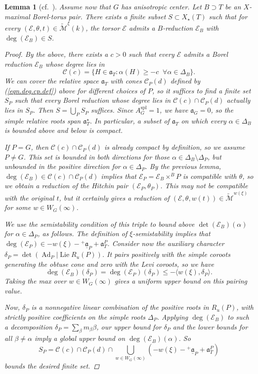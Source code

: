 \documentclass[openany]{amsbook}
\newtheorem{lemma}[theorem]{Lemma}
\theoremstyle{definition}
\theoremstyle{remark}
\numberwithin{equation}{section}
\newcommand{\cM}{\mathcal{M}}
\newcommand{\cE}{\mathcal{E}}
\newcommand{\ul}[1]{\underline{#1}}
\renewcommand{\-}{\operatorname{-}}
\renewcommand{\a}{\mathfrak{a}}
\newcommand{\on}[1]{\operatorname{#1}}
\newcommand{\ctM}{\widetilde{\cM}}
\newcommand{\Lie}{\on{Lie}}
\newcommand{\Ad}{\on{Ad}}
\newcommand{\spl}{\mathrm{spl}}
\newcommand{\gobtcone}{{}^+ \ul{\a}}
\begin{document}
\begin{lemma}[{{cf.\ \cite[{Lemme 6.1.6}]{CLI}}}]
Assume now that $G$ has anisotropic center. Let $B \supset T$ be an $X$-maximal Borel-torus pair. There exists a finite subset $S \subset X_\star(T)$ such that for every $(\cE, \theta, t) \in \ctM^\xi(k)$, the torsor $\cE$ admits a $B$-reduction $\cE_B$ with $\deg(\cE_B) \in S$.
\begin{proof}
By the above, there exists a $c > 0$ such that every $\cE$ admits a Borel reduction $\cE_B$ whose degree lies in
\[
    \mathcal{C}(c) = \{H \in \a_T : \alpha(H) \ge - c \;\;\forall \alpha \in \Delta_B\}.
\]
We can cover the relative space $\a_T$ with cones $\mathcal{C}_P(d)$ defined by (\ref{eqn.deg.cp.def}) above for different choices of $P$, so it suffices to find a finite set $S_P$ such that every Borel reduction whose degree lies in $\mathcal{C}(c) \cap \mathcal{C}_P(d)$ actually lies in $S_P$. Then $S = \bigcup_P S_P$ suffices. Since $A_G^\spl = 1$, we have $\a_G = 0$, so the simple relative roots span $\a_T^\star$. In particular, a subset of $\a_T$ on which every $\alpha \in \Delta_B$ is bounded above and below is compact. 

If $P = G$, then $\mathcal{C}(c) \cap \mathcal{C}_P(d)$ is already compact by definition, so we assume $P \neq G$. This set is bounded in both directions for those $\alpha \in \Delta_B \setminus \Delta_P$, but unbounded in the positive direction for $\alpha \in \Delta_P$. By the previous lemma, $\deg(\cE_B) \in \mathcal{C}(c) \cap \mathcal{C}_P(d)$ implies that $\cE_P = \cE_B \times^B P$ is compatible with $\theta$, so we obtain a reduction of the Hitchin pair $(\cE_P, \theta_P)$. This may not be compatible with the original $t$, but it certainly gives a reduction of $(\cE, \theta, w(t)) \in \ctM^{w(\xi)}$ for some $w \in W_G(\infty)$. 

We use the semistability condition of this triple to bound above $\det(\cE_B)(\alpha)$ for $\alpha \in \Delta_P$, as follows. The definition of $\xi$-semistability implies that $\deg(\cE_P) \in -w(\xi) - \gobtcone_P + \a_T^P$. Consider now the auxiliary character $\delta_P = \det(\Ad_P | \Lie R_u(P))$. It pairs positively with the simple coroots generating the obtuse cone and zero with the Levi coroots, so we have
$$
    \deg(\cE_B)(\delta_P) = \deg(\cE_P)(\delta_P) \le - \langle w(\xi), \delta_P \rangle.
$$
Taking the max over $w \in W_G(\infty)$ gives a uniform upper bound on this pairing value.

Now, $\delta_P$ is a nonnegative linear combination of the positive roots in $R_u(P)$, with strictly positive coefficients on the simple roots $\Delta_P$. Applying $\deg(\cE_B)$ to such a decomposition $\delta_P = \sum_\beta m_\beta \beta$, our upper bound for $\delta_P$ and the lower bounds for all $\beta \neq \alpha$ imply a global upper bound on $\deg(\cE_B)(\alpha)$. So
$$
    S_P = \mathcal{C}(c) \cap \mathcal{C}_P(d) \cap 
    \bigcup_{w \in W_G(\infty)} (-w(\xi) - \gobtcone_P + \a_T^P)
$$
bounds the desired finite set. 
\end{proof}
\end{lemma}
\end{document}

